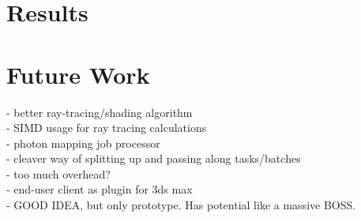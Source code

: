 \chapter{Results}

\chapter{Future Work}

- better ray-tracing/shading algorithm\\
- SIMD usage for ray tracing calculations\\
- photon mapping job processor\\
- cleaver way of splitting up and passing along tasks/batches\\
- too much overhead?\\
- end-user client as plugin for 3ds max\\
- GOOD IDEA, but only prototype. Has potential like a massive BOSS.

